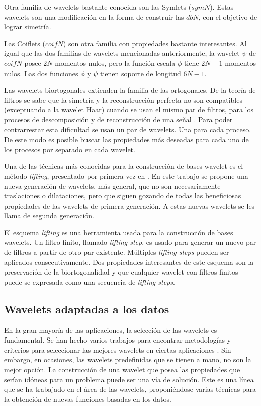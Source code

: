 Otra familia de wavelets bastante conocida son las Symlets ($symN$). Estas wavelets son una modificación en la forma
de construir las $dbN$, con el objetivo de lograr simetría.

Las Coiflets ($coifN$) \cite{daubechies1992} son otra familia con propiedades bastante interesantes. Al igual que las dos familias de 
wavelets mencionadas anteriormente, la wavelet $\psi$ de $coifN$ posee $2N$ momentos nulos, pero la función escala
$\phi$ tiene $2N-1$ momentos nulos. Las dos funciones $\phi$ y $\psi$ tienen soporte de longitud $6N-1$.

Las wavelets biortogonales extienden la familia de las ortogonales. De la teoría de filtros se sabe que
la simetría y la reconstrucción perfecta no son compatibles (exceptuando a la wavelet Haar)
cuando se usan el mismo par de filtros, para los procesos 
de descomposición y de reconstrucción de una señal \cite{misiti2007wavelets}. Para poder contrarrestar esta dificultad se usan un par de
wavelets. Una para cada proceso. De este modo es posible buscar las propiedades más deseadas para cada uno de
los procesos por separado en cada wavelet.

Una de las técnicas más conocidas para la construcción de bases wavelet es el método \textit{lifting}, presentado
por primera vez en \cite{lifting}. En este trabajo se propone una nueva generación de wavelets, más general, 
que no son necesariamente traslaciones 
o dilataciones, pero que siguen gozando de todas las beneficiosas propiedades de las wavelets 
de primera generación.
A estas nuevas wavelets se les llama de segunda generación. 

El esquema \textit{lifting} es una herramienta usada para la construcción de bases wavelets. 
Un filtro finito, llamado \textit{lifting step}, es usado para 
generar un nuevo par de filtros a partir de otro par existente. Múltiples \textit{lifting steps} pueden ser aplicados
consecutivamente. Dos propiedades interesantes de este esquema son la preservación de la biortogonalidad
y que cualquier wavelet con filtros finitos puede se expresada como una secuencia de \textit{lifting steps}.

\subsection{Wavelets adaptadas a los datos}\label{adapted-wavelets}

En la gran mayoría de las aplicaciones, la selección de las wavelets es fundamental. Se han hecho varios trabajos
para encontrar metodologías y criterios para seleccionar las mejores wavelets en ciertas aplicaciones \cite{ngui2013} \cite{doi:10.1177/14759217211010261}.
Sin embargo, en ocasiones, las wavelets predefinidas que se tienen a mano, no son la mejor opción.
La construcción de una wavelet que posea las propiedades que serían idóneas para un problema puede ser una
vía de solución. Este es una línea que se ha trabajado en el área de las wavelets, proponiéndose varias
técnicas para la obtención de nuevas funciones basadas en los datos.

